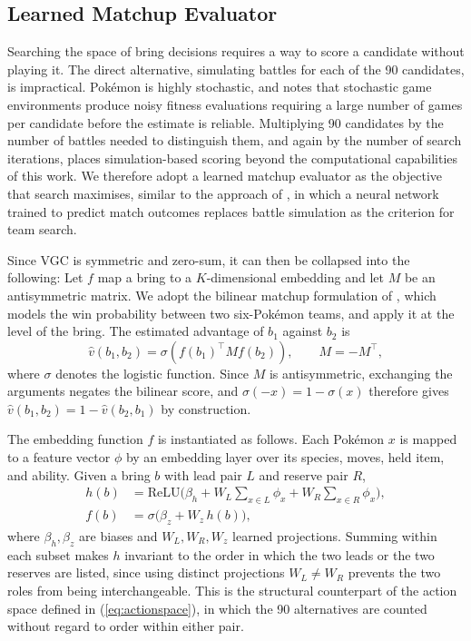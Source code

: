 \documentclass[conference]{IEEEtran}
\begin{document}
\subsection{Learned Matchup Evaluator}
\label{sec:evaluator}
Searching the space of bring decisions requires a way to score a candidate
without playing it. The direct alternative, simulating battles for each of
the 90 candidates, is impractical. Pok\'emon is highly stochastic, and
\cite{galway2008} notes that stochastic game environments produce noisy fitness
evaluations requiring a large number of games per candidate before the estimate
is reliable. Multiplying 90 candidates by the number of battles needed to
distinguish them, and again by the number of search iterations, places
simulation-based scoring beyond the computational capabilities of this work. We
therefore adopt a learned matchup evaluator as the objective that search
maximises, similar to the approach of \cite{reis2024}, in which a neural network
trained to predict match outcomes replaces battle simulation as the criterion
for team search.

Since VGC is symmetric and zero-sum, it can then be collapsed into the following: Let $f$ map a bring to a $K$-dimensional embedding and let $M$ be an
antisymmetric matrix. We adopt the bilinear matchup formulation of
\cite{oblander2025}, which models the win probability between two
six-Pok\'emon teams, and apply it at the level of the bring. The estimated
advantage of $b_1$ against $b_2$ is
\begin{equation}
\hat{v}(b_1, b_2) = \sigma\!\left( f(b_1)^{\top} M f(b_2) \right), \qquad M = -M^{\top},
\label{eq:bilinear}
\end{equation}
\noindent where $\sigma$ denotes the logistic function. Since $M$ is
antisymmetric, exchanging the arguments negates the bilinear score, and
$\sigma(-x) = 1 - \sigma(x)$ therefore gives
$\hat{v}(b_1,b_2) = 1 - \hat{v}(b_2,b_1)$ by construction.

The embedding function $f$ is instantiated as follows. Each Pok\'emon $x$ is
mapped to a feature vector $\phi$ by an embedding layer over its species,
moves, held item, and ability. Given a bring $b$ with lead pair $L$
and reserve pair $R$,
\begin{align}
h(b) &= \mathrm{ReLU}\Big(\beta_h + W_L \sum_{x \in L} \phi_x + W_R \sum_{x \in R} \phi_x\Big), \\
f(b) &= \sigma\big(\beta_z + W_z\, h(b)\big),
\end{align}
\noindent where $\beta_h, \beta_z$ are biases and $W_L, W_R, W_z$ learned
projections. Summing within each subset makes $h$ invariant to the order in
which the two leads or the two reserves are listed, since using distinct
projections $W_L \neq W_R$ prevents the two roles from being interchangeable.
This is the structural counterpart of the action space defined in
(\ref{eq:actionspace}), in which the 90 alternatives are counted without regard
to order within either pair.
\end{document}
